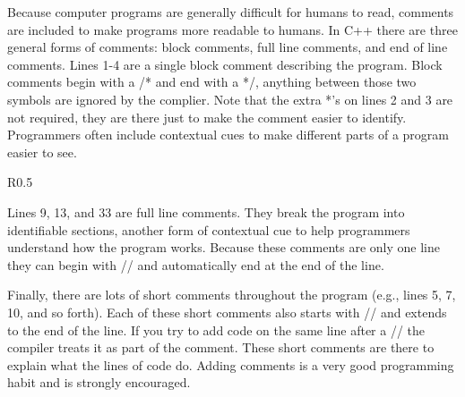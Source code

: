 Because computer programs are generally difficult for humans to read, comments are included to make programs more readable to humans.  In C++ there are three general forms of comments: block comments, full line comments, and end of line comments. 
Lines 1-4 are a single block comment describing the program.  Block comments begin with a /* and end with a */, anything between those two symbols are ignored by the complier.  Note that the extra *'s on lines 2 and 3 are not required, they are there just to make the comment easier to identify.  Programmers often include contextual cues to make different parts of a program easier to see.

\begin{wrapfigure}{R}{0.5\textwidth} \vspace{-0.3cm} 
\vspace{-0.5cm}
\end{wrapfigure}

Lines 9, 13, and 33 are full line comments.  They break the program into identifiable sections, another form of contextual cue to help programmers understand how the program works.  Because these comments are only one line they can begin with // and automatically end at the end of the line.

Finally, there are lots of short comments throughout the program (e.g., lines 5, 7, 10, and so forth).  Each of these short comments also starts with // and extends to the end of the line.  If you try to add code on the same line after a // the compiler treats it as part of the comment.  These short comments are there to explain what the lines of code do.  Adding comments is a very good programming habit and is strongly encouraged.  

